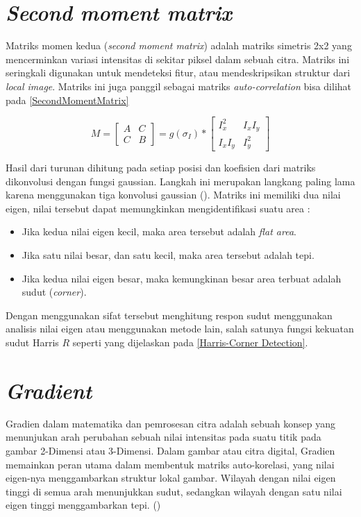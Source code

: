\section{\emph{Second moment matrix}}
  Matriks momen kedua (\emph{second moment matrix}) adalah matriks simetris 2x2 yang mencerminkan variasi intensitas di sekitar piksel dalam sebuah citra. Matriks ini seringkali digunakan untuk mendeteksi fitur, atau mendeskripsikan struktur dari \emph{local image}.
Matriks ini juga panggil sebagai matriks \emph{auto-correlation} bisa dilihat pada \ref{SecondMomentMatrix}

\begin{equation}
  M = 
    \begin{bmatrix}
      A & C \\
      C & B
    \end{bmatrix}
    = g(\sigma_{I}) *
      \begin{bmatrix}
        I_{x}^2 & I_{x}I_{y} \\
        I_{x}I_{y} & I_{y}^2
      \end{bmatrix}
  \label{SecondMomentMatrix}
\end{equation}

Hasil dari turunan dihitung pada setiap posisi dan koefisien dari matriks dikonvolusi dengan fungsi gaussian. Langkah ini merupakan langkang paling lama karena menggunakan tiga konvolusi gaussian (\cite{Sanchez2018}). 
Matriks ini memiliki dua nilai eigen, nilai tersebut dapat memungkinkan mengidentifikasi suatu area :

\begin{itemize}
  \item Jika kedua nilai eigen kecil, maka area tersebut adalah \emph{flat area}.
  \item Jika satu nilai besar, dan satu kecil, maka area tersebut adalah tepi.
  \item Jika kedua nilai eigen besar, maka kemungkinan besar area terbuat adalah sudut (\emph{corner}).
\end{itemize}

Dengan menggunakan sifat tersebut menghitung respon sudut menggunakan analisis nilai eigen atau menggunakan metode lain, salah satunya fungsi kekuatan sudut Harris \(R\) seperti yang dijelaskan pada \ref{Harris-Corner Detection}.

\section{\emph{Gradient}}
  Gradien dalam matematika dan pemrosesan citra adalah sebuah konsep yang menunjukan arah perubahan sebuah nilai intensitas pada suatu titik pada gambar 2-Dimensi atau 3-Dimensi. 
Dalam gambar atau citra digital, Gradien memainkan peran utama dalam membentuk matriks auto-korelasi, yang nilai eigen-nya menggambarkan struktur lokal gambar. 
Wilayah dengan nilai eigen tinggi di semua arah menunjukkan sudut, sedangkan wilayah dengan satu nilai eigen tinggi menggambarkan tepi. (\cite{Harris2013})


